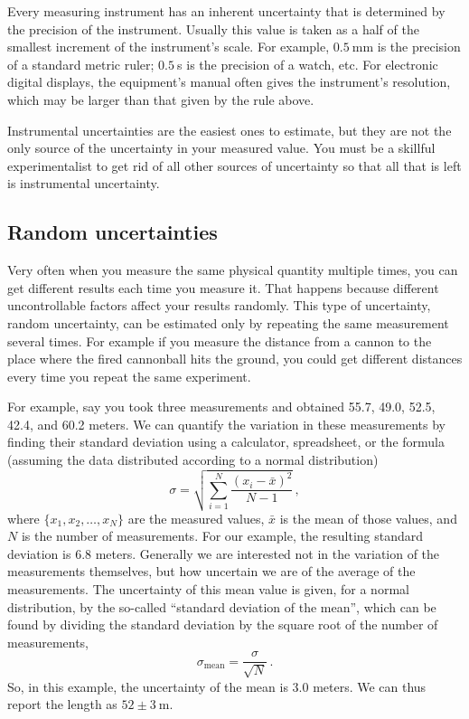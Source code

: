 Every measuring instrument has an inherent uncertainty that is determined by the precision	
  of the instrument.
Usually this value is taken as a half of the smallest increment of the instrument's scale. For example, $0.5\:$mm is the precision of a standard metric ruler; $0.5\:$s is the precision of a watch, etc. For electronic digital displays, the equipment's manual often gives the instrument's resolution, which may be larger than that given by the rule above.

Instrumental uncertainties are the easiest ones to estimate, but they are not the only source of the uncertainty in your measured value.
You must be a skillful experimentalist to get rid of all other sources of uncertainty so that all that is left is instrumental uncertainty.

\subsection{Random uncertainties}\label{unc:random}

Very often when you measure the same physical quantity multiple times, you can get different results each time you measure it.
That happens because different uncontrollable factors affect your results randomly.
This type of uncertainty, random uncertainty, can be estimated only by repeating the same measurement several times.
For example if you measure the distance from a cannon to the place where the fired cannonball hits the ground, you could get different distances every time you repeat the same experiment.	
  
For example, say you took three measurements and obtained 55.7, 49.0, 52.5, 42.4, and 60.2 meters. We can quantify the variation in these measurements by finding their standard deviation using a calculator, spreadsheet, or the formula (assuming the data distributed according to a normal distribution)
\begin{equation}
 \sigma = \sqrt{\sum_{i=1}^{N} \frac{(x_i-\bar{x})^2}{N-1}} \, ,
\end{equation}
where $\{x_1, x_2, \dots, x_N\}$ are the measured values, $\bar{x}$ is the mean of those values, and $N$ is the number of measurements.
For our example, the resulting standard deviation is 6.8 meters. Generally we are interested not in the variation of the measurements themselves, but how uncertain we are of the average of the measurements. The uncertainty of this mean value is given, for a normal distribution, by the so-called ``standard deviation of the mean'', which can be found by dividing the standard deviation by the square root of the number of measurements,
\begin{equation}\label{unc:eq:stdevmean}
\sigma_\textrm{mean} = \frac{\sigma}{\sqrt{N}} \, .
\end{equation}
So, in this example, the uncertainty of the mean is 3.0 meters. We can thus report the length as $52 \pm 3\:$m.

